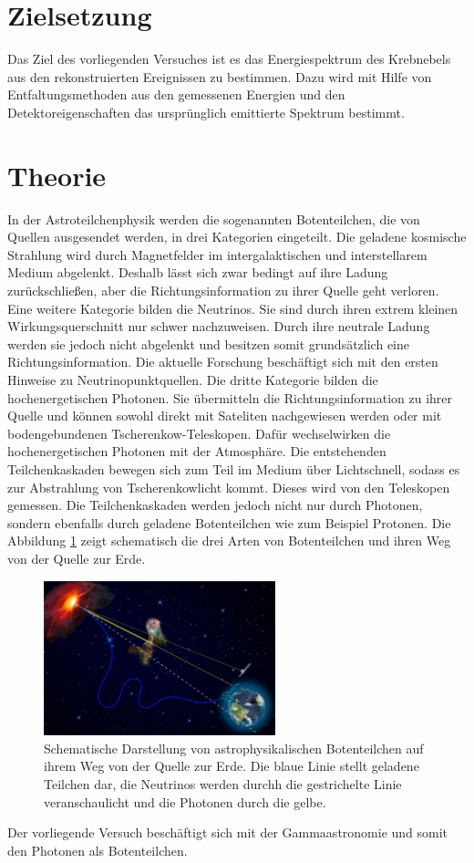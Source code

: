 \section{Zielsetzung}
Das Ziel des vorliegenden Versuches ist es das Energiespektrum des Krebnebels aus den rekonstruierten Ereignissen zu bestimmen. Dazu wird mit Hilfe von Entfaltungsmethoden aus den gemessenen Energien und den Detektoreigenschaften das ursprünglich emittierte Spektrum bestimmt.
\section{Theorie}
In der Astroteilchenphysik werden die sogenannten Botenteilchen, die von Quellen ausgesendet werden, in drei Kategorien eingeteilt. Die geladene kosmische Strahlung wird durch Magnetfelder im intergalaktischen und interstellarem Medium abgelenkt. Deshalb lässt sich zwar bedingt auf ihre Ladung zurückschließen, aber die Richtungsinformation zu ihrer Quelle geht verloren. Eine weitere Kategorie bilden die Neutrinos. Sie sind durch ihren extrem kleinen Wirkungsquerschnitt nur schwer nachzuweisen. Durch ihre neutrale Ladung werden sie jedoch nicht abgelenkt und besitzen somit grundsätzlich eine Richtungsinformation. Die aktuelle Forschung beschäftigt sich mit den ersten Hinweise zu Neutrinopunktquellen. Die dritte Kategorie bilden die hochenergetischen Photonen. Sie übermitteln die Richtungsinformation zu ihrer Quelle und können sowohl direkt mit Sateliten nachgewiesen werden oder mit bodengebundenen Tscherenkow-Teleskopen. Dafür wechselwirken die hochenergetischen Photonen mit der Atmosphäre. Die entstehenden Teilchenkaskaden bewegen sich zum Teil im Medium über Lichtschnell, sodass es zur Abstrahlung von Tscherenkowlicht kommt. Dieses wird von den Teleskopen gemessen. Die Teilchenkaskaden werden jedoch nicht nur durch Photonen, sondern ebenfalls durch geladene Botenteilchen wie zum Beispiel Protonen. Die Abbildung \ref{fig:Boten} zeigt schematisch die drei Arten von Botenteilchen und ihren Weg von der Quelle zur Erde.\\
\begin{figure}
  \centering
  \includegraphics[width=0.6\textwidth]{graphics/Folie5.png}
  \caption{Schematische Darstellung von astrophysikalischen Botenteilchen auf ihrem Weg von der Quelle zur Erde. Die blaue Linie stellt geladene Teilchen dar, die Neutrinos werden durchh die gestrichelte Linie veranschaulicht und die Photonen durch die gelbe.\cite{anleitung}}
  \label{fig:Boten}
\end{figure}
Der vorliegende Versuch beschäftigt sich mit der Gammaastronomie und somit den Photonen als Botenteilchen.

